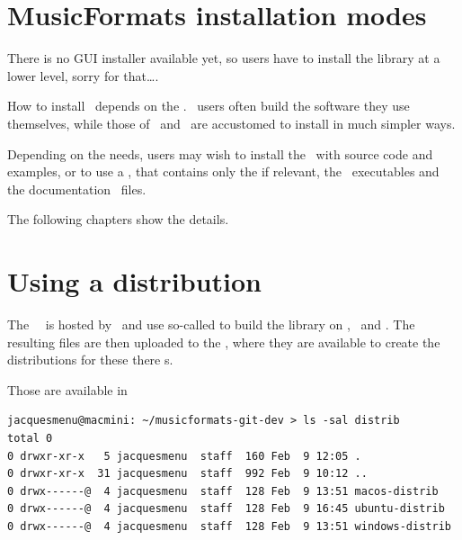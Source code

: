 
\chapter{MusicFormats installation modes}

There is no GUI installer available yet, so users have to install the library at a lower level, sorry for that\dots.

How to install \mf\ depends on the \OS. \Linux\ users often build the software they use themselves, while those of \Windows\ and \MacOS\ are accustomed to install in much simpler ways.

Depending on the needs, users may wish to install the  \mf\ with source code and examples, or to use a , that contains only the  if relevant, the \CLI\ executables and the documentation \pdf\ files.

The following chapters show the details.


\chapter{Using a distribution}

The \mf\ \repo\ is hosted by \github\ and use so-called  to build the library on \MacOS, \Ubuntu\ and \Windows. The resulting files are then uploaded to the \repo, where they are available to create the distributions for these there \OS s. 

Those are available in  
%
\begin{lstlisting}[language=Terminal]
jacquesmenu@macmini: ~/musicformats-git-dev > ls -sal distrib
total 0
0 drwxr-xr-x   5 jacquesmenu  staff  160 Feb  9 12:05 .
0 drwxr-xr-x  31 jacquesmenu  staff  992 Feb  9 10:12 ..
0 drwx------@  4 jacquesmenu  staff  128 Feb  9 13:51 macos-distrib
0 drwx------@  4 jacquesmenu  staff  128 Feb  9 16:45 ubuntu-distrib
0 drwx------@  4 jacquesmenu  staff  128 Feb  9 13:51 windows-distrib
\end{lstlisting}


